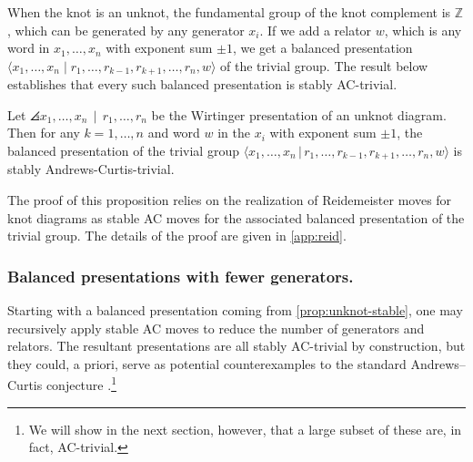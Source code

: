 When the knot is an unknot, the fundamental group of the knot complement is $\mathbb{Z}$, which can be generated by any generator $x_i$. If we add a relator $w$, which is any word in $x_1,\ldots,x_n$ with exponent sum $\pm1$, we get a balanced presentation $\langle x_1,\ldots,x_n\mid r_1,\ldots,r_{k-1},r_{k+1},\ldots,r_n,w\rangle$ of the trivial group. The result below establishes that every such balanced presentation is stably AC-trivial.
\begin{proposition} \label{prop:unknot-stable}
    Let $\angles{ x_1,\ldots, x_n\, \mid \, r_1, \ldots, r_n }$ be the Wirtinger presentation of an unknot diagram. Then for any $k=1,\ldots,n$ and word $w$ in the $x_i$ with exponent sum $\pm 1$, the balanced presentation of the trivial group $\langle x_1,\ldots, x_n\,|\, r_1,\ldots, r_{k-1}, r_{k+1},\ldots, r_n, w\rangle$ is stably Andrews-Curtis-trivial.
\end{proposition}
The proof of this proposition relies on the realization of Reidemeister moves for knot diagrams as stable AC moves for the associated balanced presentation of the trivial group. The details of the proof are given in \autoref{app:reid}.

\subsubsection{Balanced presentations with fewer generators.}
\label{sec:unknot-gives-potential-counterexamples-ac}
Starting with a balanced presentation coming from \autoref{prop:unknot-stable}, one may recursively apply stable AC moves to reduce the number of generators and relators. 
The resultant presentations are all stably AC-trivial by construction, but they could, a priori, serve as potential counterexamples to the standard Andrews--Curtis conjecture \cite{MMS}.\footnote{We will show in the next section, however, that a large subset of these are, in fact, AC-trivial.} 

